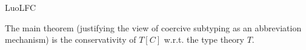 \begin{entry}{LuoLFC}
\begin{history}
	 \end{history}
	
	\begin{technicalities}
	The main theorem
(justifying the view of coercive
subtyping as an abbreviation mechanism)
is the conservativity of $T[C]$ w.r.t. the
type theory $T$. %
	\end{technicalities}	
	
	
	
	
	
	
	
	\end{entry}
